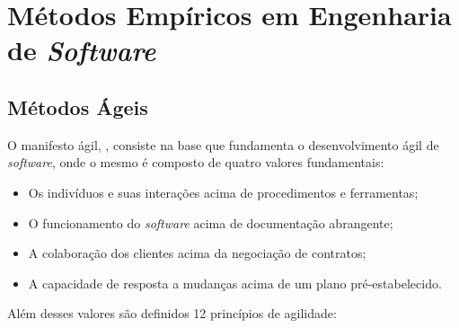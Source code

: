 \chapter{Métodos Empíricos em Engenharia de \textit{Software}}

\section{Métodos Ágeis}
O manifesto ágil, \cite{beck2001agile}, consiste na base que fundamenta o desenvolvimento ágil de
\textit{software}, onde o mesmo é composto de quatro valores fundamentais:

\begin{itemize}
    \item Os indivíduos e suas interações acima de procedimentos e ferramentas;
    \item O funcionamento do \textit{software} acima de documentação abrangente;
    \item A colaboração dos clientes acima da negociação de contratos;
    \item A capacidade de resposta a mudanças acima de um plano pré-estabelecido.
\end{itemize}

Além desses valores são definidos 12 princípios de agilidade:

